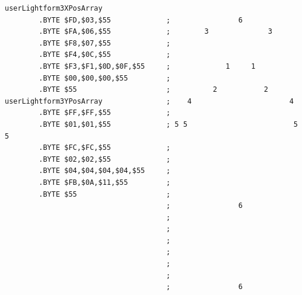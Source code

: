 \begin{lstlisting}[basicstyle=\ttfamily\scriptsize]
userLightform3XPosArray
        .BYTE $FD,$03,$55             ;                6               
        .BYTE $FA,$06,$55             ;        3              3        
        .BYTE $F8,$07,$55             ;                                
        .BYTE $F4,$0C,$55             ;                                
        .BYTE $F3,$F1,$0D,$0F,$55     ;             1     1            
        .BYTE $00,$00,$00,$55         ;                                
        .BYTE $55                     ;          2           2         
userLightform3YPosArray               ;    4                       4   
        .BYTE $FF,$FF,$55             ;                                
        .BYTE $01,$01,$55             ; 5 5                         5 5
        .BYTE $FC,$FC,$55             ;                                
        .BYTE $02,$02,$55             ;                                
        .BYTE $04,$04,$04,$04,$55     ;                                
        .BYTE $FB,$0A,$11,$55         ;                                
        .BYTE $55                     ;                                
                                      ;                6               
                                      ;                                
                                      ;                                
                                      ;                                
                                      ;                                
                                      ;                                
                                      ;                                
                                      ;                6               
\end{lstlisting}


